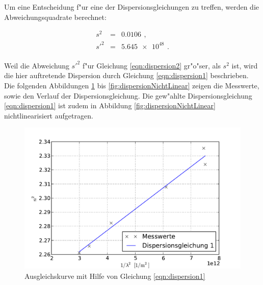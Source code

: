 
		Um eine Entscheidung f"ur eine der Dispersionsgleichungen zu treffen, werden die Abweichungsquadrate berechnet:

		\begin{eqnarray*}
			s^2 & = & \SI{0.0106}{} \,, \\
			s'^2 & = & \SI{5.645e+48}{} \,. \\
		\end{eqnarray*}

		Weil die Abweichung $s'^2$ f"ur Gleichung \eqref{eqn:dispersion2} gr"o"ser, als $s^2$ ist, wird die hier auftretende Dispersion durch Gleichung \eqref{eqn:dispersion1} beschrieben.
		Die folgenden Abbildungen \ref{fig:dispersion1} bis \ref{fig:dispersionNichtLinear} zeigen die Messwerte, sowie den Verlauf der Dispersionsgleichung.
		Die gew"ahlte Dispersionsgleichung \eqref{eqn:dispersion1} ist zudem in Abbildung \ref{fig:dispersionNichtLinear} nichtlinearisiert aufgetragen.

		\begin{figure}[h]
			\centering
			\includegraphics[width = 15cm]{img/dispersion1.pdf}
			\caption{Ausgleichskurve mit Hilfe von Gleichung \eqref{eqn:dispersion1} \label{fig:dispersion1}}
		\end{figure}

